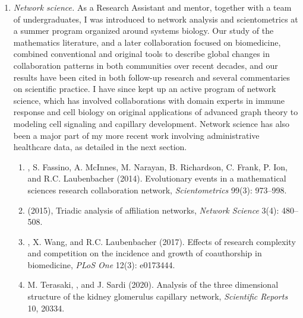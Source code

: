 \documentclass{nihbiosketch}
\begin{document}
\begin{enumerate}

\item \emph{Network science.}
As a Research Assistant and mentor, together with a team of undergraduates, I was introduced to network analysis and scientometrics at a summer program organized around systems biology.
Our study of the mathematics literature, and a later collaboration focused on biomedicine, combined conventional and original tools to describe global changes in collaboration patterns in both communities over recent decades, and our results have been cited in both follow-up research and several commentaries on scientific practice.
I have since kept up an active program of network science, which has involved collaborations with domain experts in immune response and cell biology on original applications of advanced graph theory to modeling cell signaling and capillary development.
Network science has also been a major part of my more recent work involving administrative healthcare data, as detailed in the next section.

\begin{enumerate}
\item {}, S. Fassino, A. McInnes, M. Narayan, B. Richardson, C. Frank, P. Ion, and R.C. Laubenbacher (2014). Evolutionary events in a mathematical sciences research collaboration network, \emph{Scientometrics} 99(3): 973--998.
\item {} (2015), Triadic analysis of affiliation networks, \emph{Network Science} 3(4): 480--508.
\item {}, X. Wang, and R.C. Laubenbacher (2017). Effects of research complexity and competition on the incidence and growth of coauthorship in biomedicine, \emph{PLoS One} 12(3): e0173444.
\item M. Terasaki, , and J. Sardi (2020). Analysis of the three dimensional structure of the kidney glomerulus capillary network, \emph{Scientific Reports} 10, 20334.
\end{enumerate}


\end{enumerate}
\end{document}

